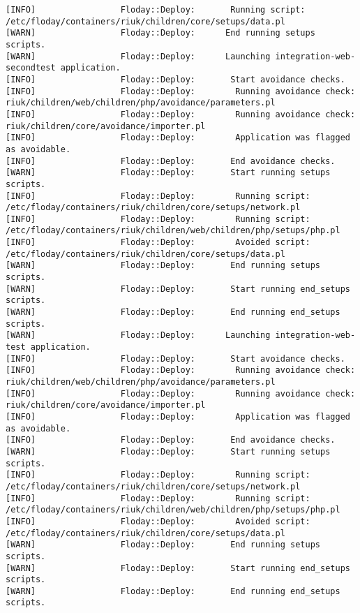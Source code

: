 \begin{lstlisting}[float=t, caption={Sortie d'une exécution de \emph{Floday}}, label=fig_1.4_floday, basicstyle=\tiny, xleftmargin=-3cm]
[INFO]                 Floday::Deploy:       Running script: /etc/floday/containers/riuk/children/core/setups/data.pl
[WARN]                 Floday::Deploy:      End running setups scripts.
[WARN]                 Floday::Deploy:      Launching integration-web-secondtest application.
[INFO]                 Floday::Deploy:       Start avoidance checks.
[INFO]                 Floday::Deploy:        Running avoidance check: riuk/children/web/children/php/avoidance/parameters.pl
[INFO]                 Floday::Deploy:        Running avoidance check: riuk/children/core/avoidance/importer.pl
[INFO]                 Floday::Deploy:        Application was flagged as avoidable.
[INFO]                 Floday::Deploy:       End avoidance checks.
[WARN]                 Floday::Deploy:       Start running setups scripts.
[INFO]                 Floday::Deploy:        Running script: /etc/floday/containers/riuk/children/core/setups/network.pl
[INFO]                 Floday::Deploy:        Running script: /etc/floday/containers/riuk/children/web/children/php/setups/php.pl
[INFO]                 Floday::Deploy:        Avoided script: /etc/floday/containers/riuk/children/core/setups/data.pl
[WARN]                 Floday::Deploy:       End running setups scripts.
[WARN]                 Floday::Deploy:       Start running end_setups scripts.
[WARN]                 Floday::Deploy:       End running end_setups scripts.
[WARN]                 Floday::Deploy:      Launching integration-web-test application.
[INFO]                 Floday::Deploy:       Start avoidance checks.
[INFO]                 Floday::Deploy:        Running avoidance check: riuk/children/web/children/php/avoidance/parameters.pl
[INFO]                 Floday::Deploy:        Running avoidance check: riuk/children/core/avoidance/importer.pl
[INFO]                 Floday::Deploy:        Application was flagged as avoidable.
[INFO]                 Floday::Deploy:       End avoidance checks.
[WARN]                 Floday::Deploy:       Start running setups scripts.
[INFO]                 Floday::Deploy:        Running script: /etc/floday/containers/riuk/children/core/setups/network.pl
[INFO]                 Floday::Deploy:        Running script: /etc/floday/containers/riuk/children/web/children/php/setups/php.pl
[INFO]                 Floday::Deploy:        Avoided script: /etc/floday/containers/riuk/children/core/setups/data.pl
[WARN]                 Floday::Deploy:       End running setups scripts.
[WARN]                 Floday::Deploy:       Start running end_setups scripts.
[WARN]                 Floday::Deploy:       End running end_setups scripts.

\end{lstlisting}
